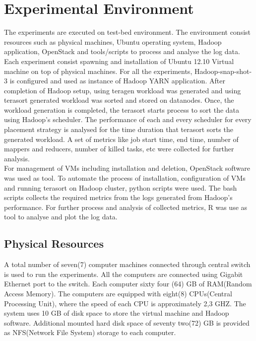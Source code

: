 \section{Experimental Environment}

The experiments are executed on test-bed environment. The environment consist resources such as physical machines, Ubuntu operating system, Hadoop application, OpenStack and tools/scripts to process and analyse the log data.\\


Each experiment consist spawning and installation of Ubuntu 12.10 Virtual machine on top of physical machines. For all the experiments, Hadoop-snap-shot-3 is configured and used as instance of Hadoop YARN application.  After completion of Hadoop setup, using teragen workload was generated and using terasort generated workload was sorted and stored on datanodes. Once, the workload generation is completed, the terasort starts process to sort the data using Hadoop's scheduler. The performance of each and every scheduler for every placement strategy is analysed for the time duration that terasort sorts the generated workload. A set of metrics like job start time, end time, number of mappers and reducers, number of killed tasks, etc were collected for further analysis.\\    

For management of VMs including installation and deletion, OpenStack software was used as tool. To automate the process of installation, configuration of VMs and running terasort on Hadoop cluster, python scripts were used. The bash scripts collects the required metrics from the logs generated from Hadoop's performance. For further process and analysis of collected metrics, R was use as tool to analyse and plot the log data. 


\subsection{Physical Resources}
A total number of seven(7) computer machines connected through central switch is used to run the experiments. All the computers are connected using Gigabit Ethernet port to the switch. Each computer sixty four (64) GB of RAM(Random Access Memory). The computers are equipped with eight(8) CPUs(Central Processing Unit), where the speed of each CPU is approximately 2,3 GHZ. The system uses 10 GB of disk space to store the virtual machine and Hadoop software. Additional mounted hard disk space of seventy two(72) GB is provided as NFS(Network File System) storage to each computer. 

